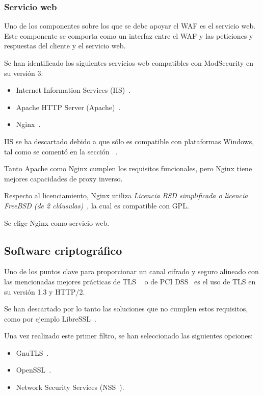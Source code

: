 \subsubsection{Servicio web}
\par Uno de los componentes sobre los que se debe apoyar el WAF es el servicio web. Este componente se comporta como un interfaz entre el WAF y las peticiones y respuestas del cliente y el servicio web.
\par Se han identificado los siguientes servicios web compatibles con  ModSecurity en su versión 3:
\begin{itemize}
  \item Internet Information Services (IIS)~\cite{iis}.
  \item Apache HTTP Server (Apache)~\cite{apache}.
  \item Nginx~\cite{nginx}.
\end{itemize}
\par IIS se ha descartado debido a que sólo es compatible con plataformas Windows, tal como se comentó en la sección ~.

\par Tanto Apache como Nginx cumplen los requisitos funcionales, pero Nginx tiene mejores capacidades de proxy inverso.

\par Respecto al licenciamiento, Nginx utiliza {\em Licencia BSD simplificada o licencia FreeBSD (de 2 cláusulas)}~\cite{wiki:SimplifiedBSDLicense}, la cual es compatible con GPL.

\par Se elige Nginx como servicio web.

\subsection{Software criptográfico}
\par Uno de los puntos clave para proporcionar un canal cifrado y seguro alineado con las mencionadas mejores prácticas de TLS ~\cite{TLSBestPractices} o de PCI DSS~\cite{pcidssrequirements} es el uso de TLS en su versión 1.3 y HTTP/2.
\par Se han descartado por lo tanto las soluciones que no cumplen estos requisitos, como por ejemplo LibreSSL~\cite{libressl}.
\par Una vez realizado este primer filtro, se han seleccionado las siguientes opciones:
\begin{itemize}
  \item GnuTLS~\cite{gnutls}.
  \item OpenSSL~\cite{openssl}.
  \item Network Security Services (NSS~\cite{nss}).
\end{itemize}

